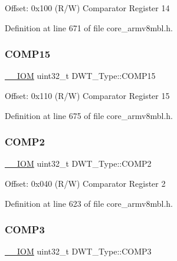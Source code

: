 Offset\+: 0x100 (R/W) Comparator Register 14 

Definition at line 671 of file core\+\_\+armv8mbl.\+h.

\mbox{\label{struct_d_w_t___type_aa46b44e5aacd3ca3937741f423ab480f}} 
\subsubsection{\texorpdfstring{C\+O\+M\+P15}{COMP15}}
{\footnotesize\ttfamily \hyperlink{core__sc300_8h_ab6caba5853a60a17e8e04499b52bf691}{\+\_\+\+\_\+\+I\+OM} uint32\+\_\+t D\+W\+T\+\_\+\+Type\+::\+C\+O\+M\+P15}

Offset\+: 0x110 (R/W) Comparator Register 15 

Definition at line 675 of file core\+\_\+armv8mbl.\+h.

\mbox{\label{struct_d_w_t___type_a5ae6dde39989f27bae90afc2347deb46}} 
\subsubsection{\texorpdfstring{C\+O\+M\+P2}{COMP2}}
{\footnotesize\ttfamily \hyperlink{core__sc300_8h_ab6caba5853a60a17e8e04499b52bf691}{\+\_\+\+\_\+\+I\+OM} uint32\+\_\+t D\+W\+T\+\_\+\+Type\+::\+C\+O\+M\+P2}

Offset\+: 0x040 (R/W) Comparator Register 2 

Definition at line 623 of file core\+\_\+armv8mbl.\+h.

\mbox{\label{struct_d_w_t___type_a85eb73d1848ac3f82d39d6c3e8910847}} 
\subsubsection{\texorpdfstring{C\+O\+M\+P3}{COMP3}}
{\footnotesize\ttfamily \hyperlink{core__sc300_8h_ab6caba5853a60a17e8e04499b52bf691}{\+\_\+\+\_\+\+I\+OM} uint32\+\_\+t D\+W\+T\+\_\+\+Type\+::\+C\+O\+M\+P3}

